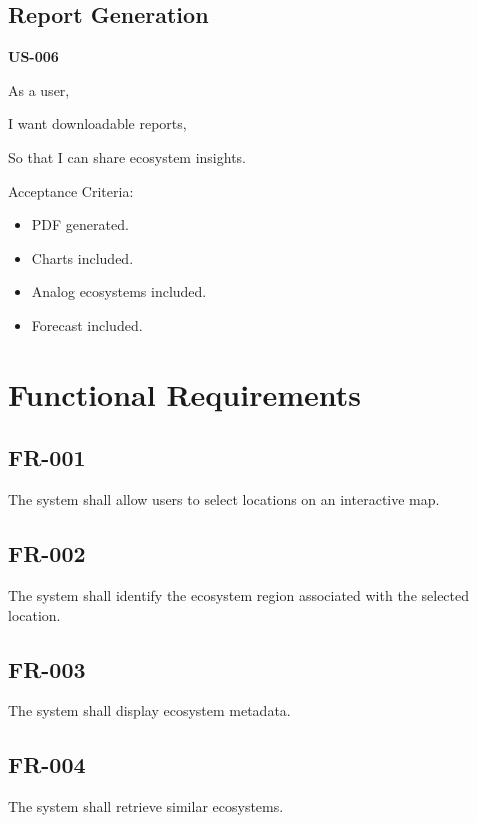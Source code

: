 \documentclass[11pt,a4paper]{article}
\begin{document}

\subsection{Report Generation}

\textbf{US-006}

As a user,

I want downloadable reports,

So that I can share ecosystem insights.

Acceptance Criteria:

\begin{itemize}
\item PDF generated.
\item Charts included.
\item Analog ecosystems included.
\item Forecast included.
\end{itemize}

\section{Functional Requirements}

\subsection{FR-001}

The system shall allow users to select locations on an interactive map.

\subsection{FR-002}

The system shall identify the ecosystem region associated with the selected location.

\subsection{FR-003}

The system shall display ecosystem metadata.

\subsection{FR-004}

The system shall retrieve similar ecosystems.
\end{document}
